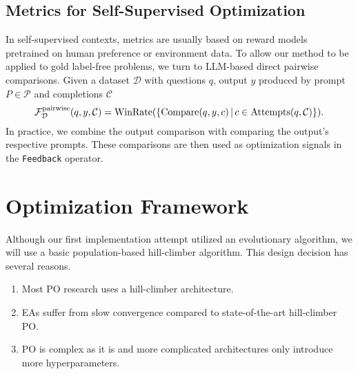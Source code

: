 \subsection{Metrics for Self-Supervised Optimization}\label{sec:ssometrics}
In self-supervised contexts, metrics are usually based on reward models pretrained on human preference or environment data.
To allow our method to be applied to gold label-free problems, we turn to LLM-based direct pairwise comparisons.
Given a dataset $\mathcal{D}$ with questions $q$, output $y$ produced by prompt $P \in \mathcal{P}$ and completions $\mathcal{C}$
\begin{equation}
    \mathcal{F}_{\mathcal{D}}^{\text{pairwise}}(q, y, \mathcal{C}) = \operatorname{WinRate}(\{\operatorname{Compare}(q,y,c)\, \vert \, c\in\operatorname{Attempts}(q,\mathcal{C})\}).
\end{equation}
In practice, we combine the output comparison with comparing the output's respective prompts.
These comparisons are then used as optimization signals in the \texttt{Feedback} operator.

\section{Optimization Framework}
Although our first implementation attempt utilized an evolutionary algorithm, we will use a basic population-based hill-climber algorithm.
This design decision has several reasons.
\begin{enumerate}
    \item Most PO research uses a hill-climber architecture.
    \item EAs suffer from slow convergence compared to state-of-the-art hill-climber PO\cite{xiang2025selfsupervisedpromptoptimization}.
    \item PO is complex as it is and more complicated architectures only introduce more hyperparameters.
\end{enumerate}


